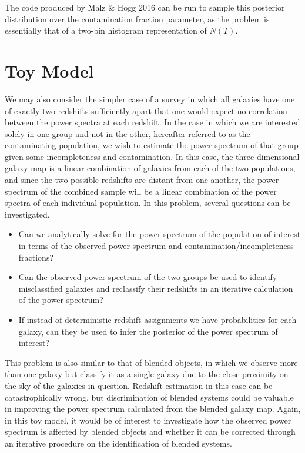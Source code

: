 \documentclass[12pt, onecolumn]{emulateapj}
\begin{document}
The code produced by Malz \& Hogg 2016 can be run to sample this posterior distribution over the contamination fraction parameter, as the problem is essentially that of a two-bin histogram representation of $N(T)$.   

\section{Toy Model}
\label{sec:toy}

We may also consider the simpler case of a survey in which all galaxies have one of exactly two redshifts sufficiently apart that one would expect no correlation between the power spectra at each redshift.  In the case in which we are interested solely in one group and not in the other, hereafter referred to as the contaminating population, we wish to estimate the power spectrum of that group given some incompleteness and contamination.  In this case, the three dimensional galaxy map is a linear combination of galaxies from each of the two populations, and since the two possible redshifts are distant from one another, the power spectrum of the combined sample will be a linear combination of the power spectra of each individual population.  In this problem, several questions can be investigated.

\begin{itemize}
\item Can we analytically solve for the power spectrum of the population of interest in terms of the observed power spectrum and contamination/incompleteness fractions?
\item Can the observed power spectrum of the two groups be used to identify misclassified galaxies and reclassify their redshifts in an iterative calculation of the power spectrum?
\item If instead of deterministic redshift assignments we have probabilities for each galaxy, can they be used to infer the posterior of the power spectrum of interest?
\end{itemize}

This problem is also similar to that of blended objects, in which we observe more than one galaxy but classify it as a single galaxy due to the close proximity on the sky of the galaxies in question.  Redshift estimation in this case can be catastrophically wrong, but discrimination of blended systems could be valuable in improving the power spectrum calculated from the blended galaxy map.  Again, in this toy model, it would be of interest to investigate how the observed power spectrum is affected by blended objects and whether it can be corrected through an iterative procedure on the identification of blended systems.





\end{document}
